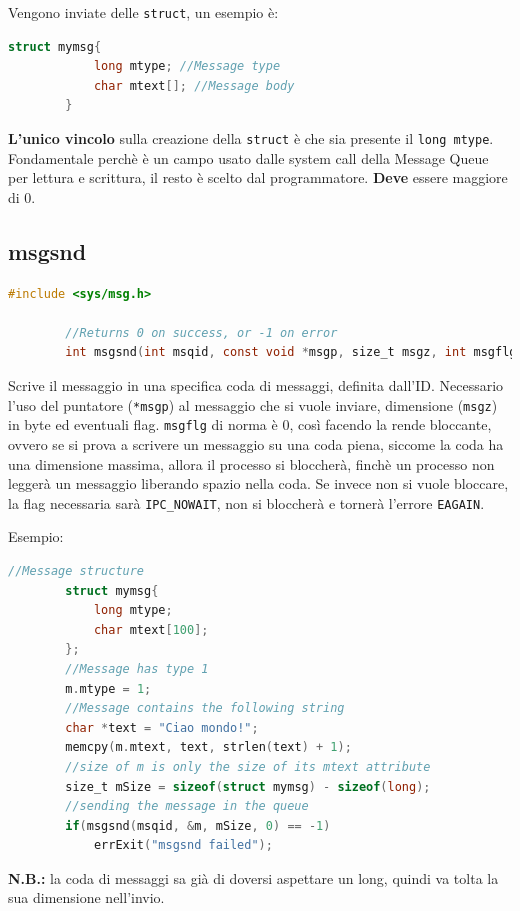 \documentclass[a4paper, 12pt]{book}
\begin{document}
    Vengono inviate delle \verb|struct|, un esempio è:
    \begin{lstlisting}[language=C]
        struct mymsg{
            long mtype; //Message type 
            char mtext[]; //Message body 
        }
    \end{lstlisting}
    \textbf{L'unico vincolo} sulla creazione della 
    \verb|struct| è che sia presente il 
    \verb|long mtype|. Fondamentale perchè è un campo 
    usato dalle system call della Message Queue per lettura 
    e scrittura, il resto è scelto dal programmatore. 
    \textbf{Deve} essere maggiore di 0.

    \subsection{msgsnd}

    \begin{lstlisting}[language=C]
        #include <sys/msg.h>

        //Returns 0 on success, or -1 on error 
        int msgsnd(int msqid, const void *msgp, size_t msgz, int msgflg);
    \end{lstlisting}
    Scrive il messaggio in una specifica coda di messaggi, 
    definita dall'ID. Necessario l'uso del puntatore (\verb|*msgp|)
    al messaggio che si vuole inviare, dimensione (\verb|msgz|) 
    in byte ed eventuali flag. \verb|msgflg| di norma 
    è 0, così facendo la rende bloccante, ovvero se si 
    prova a scrivere un messaggio su una coda piena, siccome 
    la coda ha una dimensione massima, allora il processo 
    si bloccherà, finchè un processo non leggerà un messaggio 
    liberando spazio nella coda. Se invece non si vuole 
    bloccare, la flag necessaria sarà \verb|IPC_NOWAIT|,
    non si bloccherà e tornerà l'errore \verb|EAGAIN|.

    Esempio:
    \begin{lstlisting}[language=C]
        //Message structure 
        struct mymsg{
            long mtype; 
            char mtext[100]; 
        };
        //Message has type 1
        m.mtype = 1;
        //Message contains the following string 
        char *text = "Ciao mondo!";
        memcpy(m.mtext, text, strlen(text) + 1);
        //size of m is only the size of its mtext attribute 
        size_t mSize = sizeof(struct mymsg) - sizeof(long);
        //sending the message in the queue 
        if(msgsnd(msqid, &m, mSize, 0) == -1)
            errExit("msgsnd failed");
    \end{lstlisting}
    \textbf{N.B.:} la coda di messaggi sa già di doversi 
    aspettare un long, quindi va tolta la sua dimensione 
    nell'invio.
\end{document}
